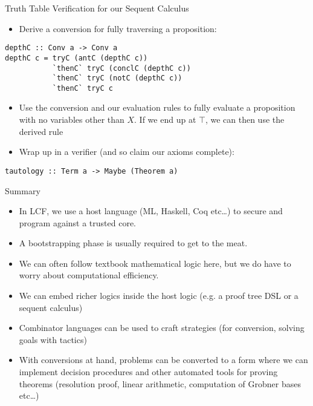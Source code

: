 \documentclass[presentation]{beamer}
\begin{document}
\begin{frame}[fragile,label={sec:orgheadline30}]{Truth Table Verification for our Sequent Calculus}
 \begin{itemize}
\item Derive a conversion for fully traversing a proposition:
\end{itemize}
\begin{verbatim}
depthC :: Conv a -> Conv a
depthC c = tryC (antC (depthC c))
           `thenC` tryC (conclC (depthC c))
           `thenC` tryC (notC (depthC c))
           `thenC` tryC c
\end{verbatim}

\begin{itemize}
\item Use the conversion and our evaluation rules to fully evaluate a proposition with no
variables other than \(X\). If we end up at \(\top\), we can then use the derived rule
\end{itemize}

\begin{prooftree}
\end{prooftree}

\begin{itemize}
\item Wrap up in a verifier (and so claim our axioms complete):
\end{itemize}

\begin{verbatim}
tautology :: Term a -> Maybe (Theorem a)
\end{verbatim}
\end{frame}

\begin{frame}[label={sec:orgheadline31}]{Summary}
\begin{itemize}
\item In LCF, we use a host language (ML, Haskell, Coq etc\ldots{}) to secure and program
against a trusted core.
\item A bootstrapping phase is usually required to get to the meat.
\item We can often follow textbook mathematical logic here, but we do have to worry
about computational efficiency.
\item We can embed richer logics inside the host logic (e.g. a proof tree DSL or a
sequent calculus)
\item Combinator languages can be used to craft strategies (for conversion, solving
goals with tactics)
\item With conversions at hand, problems can be converted to a form where we can
implement decision procedures and other automated tools for proving theorems
(resolution proof, linear arithmetic, computation of Grobner bases etc\ldots{})
\end{itemize}
\end{frame}
\end{document}
